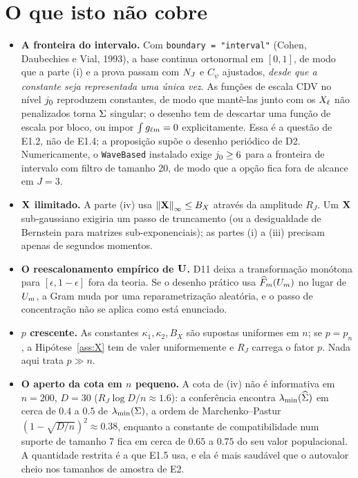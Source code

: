\documentclass[11pt]{article}
\newcommand{\lmin}{\lambda_{\min}}
\begin{document}
\section*{O que isto não cobre}

\begin{itemize}[leftmargin=*]
    \item \textbf{A fronteira do intervalo.} Com \texttt{boundary = "interval"} (Cohen, Daubechies e Vial,
    1993), a base continua ortonormal em $[0,1]$, de modo que a parte (i) e a prova passam com $N_{J}$ e
    $C_\psi$ ajustados, \emph{desde que a constante seja representada uma única vez}. As funções de escala
    CDV no nível $j_{0}$ reproduzem constantes, de modo que mantê-las junto com os $X_{\ell}$ não
    penalizados torna $\Sigma$ singular; o desenho tem de descartar uma função de escala por bloco, ou impor
    $\int g_{\ell m} = 0$ explicitamente. Essa é a questão de E1.2, não de E1.4; a proposição supõe o
    desenho periódico de D2. Numericamente, o \texttt{WaveBased} instalado exige $j_{0} \ge 6$ para a
    fronteira de intervalo com filtro de tamanho 20, de modo que a opção fica fora de alcance em $J = 3$.
    \item \textbf{$\mathbf{X}$ ilimitado.} A parte (iv) usa $\left\lVert \mathbf{X} \right\rVert_\infty \le B_X$ através da amplitude $R_J$.
    Um $\mathbf{X}$ sub-gaussiano exigiria um passo de truncamento (ou a desigualdade de Bernstein para matrizes
    sub-exponenciais); as partes (i) a (iii) precisam apenas de segundos momentos.
    \item \textbf{O reescalonamento empírico de $\mathbf{U}$.} D11 deixa a transformação monótona para
    $[\epsilon, 1-\epsilon]$ fora da teoria. Se o desenho prático usa $\widehat F_{m}(U_{m})$ no lugar de
    $U_{m}$, a Gram muda por uma reparametrização aleatória, e o passo de concentração não se aplica como
    está enunciado.
    \item \textbf{$p$ crescente.} As constantes $\kappa_1, \kappa_2, B_X$ são supostas uniformes em $n$; se
    $p = p_n$, a Hipótese~\ref{ass:X} tem de valer uniformemente e $R_J$ carrega o fator $p$. Nada aqui
    trata $p \gg n$.
    \item \textbf{O aperto da cota em $n$ pequeno.} A cota de (iv) não é informativa em $n = 200$, $D = 30$
    ($R_J\log D/n \approx 1.6$): a conferência encontra $\lmin(\Gramhat)$ em cerca de $0.4$ a $0.5$ de
    $\lmin(\Gram)$, a ordem de Marchenko--Pastur $(1 - \sqrt{D/n})^2 \approx 0.38$, enquanto a constante de
    compatibilidade num suporte de tamanho 7 fica em cerca de $0.65$ a $0.75$ do seu valor populacional. A
    quantidade restrita é a que E1.5 usa, e ela é mais saudável que o autovalor cheio nos tamanhos de
    amostra de E2.
\end{itemize}
\end{document}
